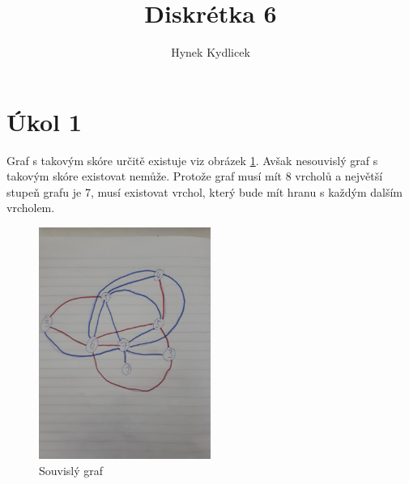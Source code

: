 \documentclass[a4paper]{article}
\author{Hynek Kydlicek}
\title{Diskrétka 6}
\begin{document}
\maketitle
\section{Úkol 1}
Graf s takovým skóre určitě existuje viz obrázek \ref{fig:Souvisly graf}.
Avšak nesouvislý graf s takovým skóre existovat nemůže. Protože graf musí mít 8 vrcholů a největší stupeň grafu je 7,
musí existovat vrchol, který bude mít hranu s každým dalším vrcholem.
\begin{figure}[htpb]
    \centering
    \includegraphics[width=0.5\textwidth]{ukol1.jpg}
    \caption{Souvislý graf}
    \label{fig:Souvisly graf}
\end{figure}
\end{document}

